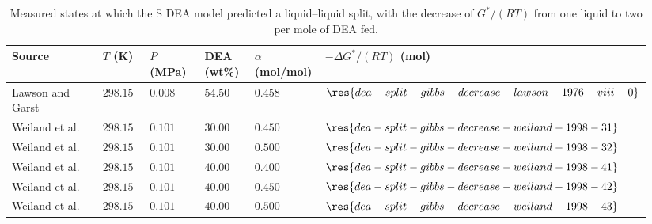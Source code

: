 \begin{table}[!htbp]\small\setlength{\tabcolsep}{2pt}\caption{Measured states at which the S DEA model predicted a liquid--liquid split, with the decrease of $G^*/(RT)$ from one liquid to two per mole of DEA fed.}\label{tab:supplement-liquid-splits}
\begin{tabular}{@{}>{\raggedright\arraybackslash}p{0.34\linewidth}>{\raggedright\arraybackslash}p{0.1\linewidth}>{\raggedright\arraybackslash}p{0.12\linewidth}>{\raggedright\arraybackslash}p{0.1\linewidth}>{\raggedright\arraybackslash}p{0.12\linewidth}>{\raggedright\arraybackslash}p{0.16\linewidth}@{}}
\toprule Source & $T$ (K) & $P$ (MPa) & DEA (wt\%) & $\alpha$ (mol/mol) & $-\Delta G^*/(RT)$ (mol) \\ \midrule
Lawson and Garst \cite{lawsonGasSweeteningData1976} & $298.15$ & $0.008$ & $54.50$ & $0.458$ & $\res{dea-split-gibbs-decrease-lawson-1976-viii-0}$ \\
Weiland et al.\ \cite{Weiland1998} & $298.15$ & $0.101$ & $30.00$ & $0.450$ & $\res{dea-split-gibbs-decrease-weiland-1998-31}$ \\
Weiland et al.\ \cite{Weiland1998} & $298.15$ & $0.101$ & $30.00$ & $0.500$ & $\res{dea-split-gibbs-decrease-weiland-1998-32}$ \\
Weiland et al.\ \cite{Weiland1998} & $298.15$ & $0.101$ & $40.00$ & $0.400$ & $\res{dea-split-gibbs-decrease-weiland-1998-41}$ \\
Weiland et al.\ \cite{Weiland1998} & $298.15$ & $0.101$ & $40.00$ & $0.450$ & $\res{dea-split-gibbs-decrease-weiland-1998-42}$ \\
Weiland et al.\ \cite{Weiland1998} & $298.15$ & $0.101$ & $40.00$ & $0.500$ & $\res{dea-split-gibbs-decrease-weiland-1998-43}$ \\
\bottomrule\end{tabular}
\par{}\end{table}
